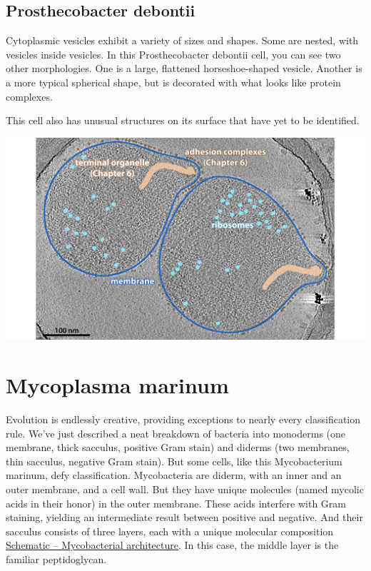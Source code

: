 \documentclass[]{tufte-book}
\begin{document}
\hypertarget{Cytoplasmic_vesicle_variety}{\subsection{Prosthecobacter
debontii}\label{Cytoplasmic_vesicle_variety}}

Cytoplasmic vesicles exhibit a variety of sizes and shapes. Some are
nested, with vesicles inside vesicles. In this Prosthecobacter debontii
cell, you can see two other morphologies. One is a large, flattened
horseshoe-shaped vesicle. Another is a more typical spherical shape, but
is decorated with what looks like protein complexes.

This cell also has unusual structures on its surface that have yet to be
identified.

\includegraphics{img/02_static/2_1_Mgenitalium}

\section{Mycoplasma marinum}\label{mycoplasma-marinum}

Evolution is endlessly creative, providing exceptions to nearly every
classification rule. We've just described a neat breakdown of bacteria
into monoderms (one membrane, thick sacculus, positive Gram stain) and
diderms (two membranes, thin sacculus, negative Gram stain). But some
cells, like this Mycobacterium marinum, defy classification.
Mycobacteria are diderm, with an inner and an outer membrane, and a cell
wall. But they have unique molecules (named mycolic acids in their
honor) in the outer membrane. These acids interfere with Gram staining,
yielding an intermediate result between positive and negative. And their
sacculus consists of three layers, each with a unique molecular
composition \protect\hyperlink{fig:2-5-1}{Schematic -- Mycobacterial
architecture}. In this case, the middle layer is the familiar
peptidoglycan.
\end{document}
